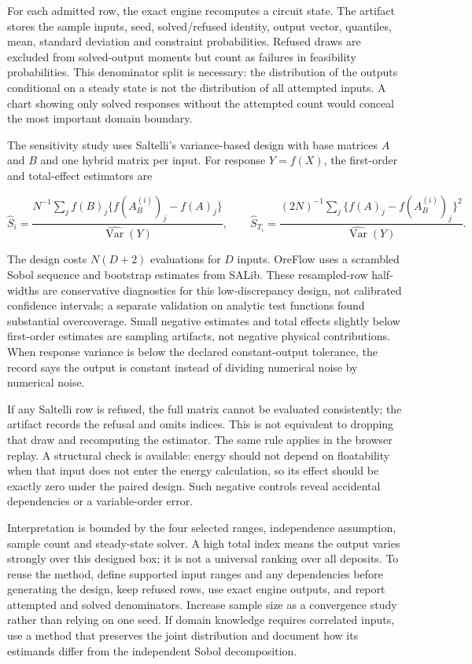 \documentclass[10pt]{article}
\begin{document}
For each admitted row, the exact engine recomputes a circuit state. The
artifact stores the sample inputs, seed, solved/refused identity, output
vector, quantiles, mean, standard deviation and constraint
probabilities. Refused draws are excluded from solved-output moments but
count as failures in feasibility probabilities. This denominator split
is necessary: the distribution of the outputs conditional on a steady
state is not the distribution of all attempted inputs. A chart showing
only solved responses without the attempted count would conceal the most
important domain boundary.

The sensitivity study uses Saltelli's variance-based design with base
matrices \(A\) and \(B\) and one hybrid matrix per input. For response
\(Y=f(X)\), the first-order and total-effect estimators are

\[\hat S_i=\frac{N^{-1}\sum_j f(B)_j\{f(A_B^{(i)})_j-f(A)_j\}}{\widehat{\operatorname{Var}}(Y)},\qquad
\hat S_{T_i}=\frac{(2N)^{-1}\sum_j\{f(A)_j-f(A_B^{(i)})_j\}^2}{\widehat{\operatorname{Var}}(Y)}.\]

The design costs \(N(D+2)\) evaluations for \(D\) inputs. OreFlow uses a
scrambled Sobol sequence and bootstrap estimates from SALib. These
resampled-row half-widths are conservative diagnostics for this
low-discrepancy design, not calibrated confidence intervals; a separate
validation on analytic test functions found substantial overcoverage.
Small negative estimates and total effects slightly below first-order
estimates are sampling artifacts, not negative physical contributions.
When response variance is below the declared constant-output tolerance,
the record says the output is constant instead of dividing numerical
noise by numerical noise.

If any Saltelli row is refused, the full matrix cannot be evaluated
consistently; the artifact records the refusal and omits indices. This
is not equivalent to dropping that draw and recomputing the estimator.
The same rule applies in the browser replay. A structural check is
available: energy should not depend on floatability when that input does
not enter the energy calculation, so its effect should be exactly zero
under the paired design. Such negative controls reveal accidental
dependencies or a variable-order error.

Interpretation is bounded by the four selected ranges, independence
assumption, sample count and steady-state solver. A high total index
means the output varies strongly over this designed box; it is not a
universal ranking over all deposits. To reuse the method, define
supported input ranges and any dependencies before generating the
design, keep refused rows, use exact engine outputs, and report
attempted and solved denominators. Increase sample size as a convergence
study rather than relying on one seed. If domain knowledge requires
correlated inputs, use a method that preserves the joint distribution
and document how its estimands differ from the independent Sobol
decomposition.
\end{document}
